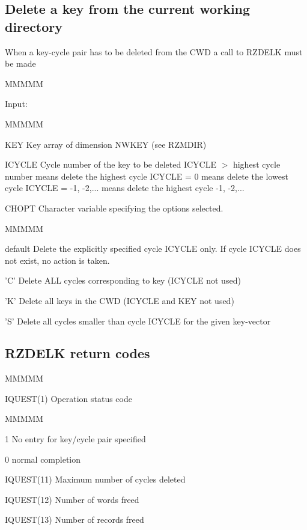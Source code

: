\subsection{Delete a key from the current working directory}
\par When a key-cycle pair has to be deleted from the
CWD a call to RZDELK must be made
\begin{DL}{MMMMM}
\item[Input:
]
\begin{DL}{MMMMM}
\item[KEY
]Key array of dimension NWKEY (see RZMDIR)
\item[ICYCLE
]Cycle number of the key to be deleted
\newline ICYCLE $>$ highest cycle number means delete the highest cycle
\newline ICYCLE = 0 means delete the lowest cycle
\newline ICYCLE = -1, -2,... means delete the highest cycle -1, -2,...
\item[CHOPT
]Character variable specifying the options selected.
\begin{DL}{MMMMM}
\item[default
]Delete the explicitly specified cycle ICYCLE only.
\newline If cycle ICYCLE does not exist, no action is taken.
\item['C'
]Delete ALL cycles corresponding to key (ICYCLE not used)
\item['K'
]Delete all keys in the CWD (ICYCLE and KEY not used)
\item['S'
]Delete all cycles smaller than cycle ICYCLE for the given key-vector
\end{DL}
\end{DL}
\end{DL}
\subsection{RZDELK return codes}
\begin{DL}{MMMMM}
\item[IQUEST(1)
]Operation status code
\begin{DL}{MMMMM}
\item[ 1
]No entry for key/cycle pair specified
\item[ 0
]normal completion
\end{DL}
\par
\item[IQUEST(11)
]Maximum number of cycles deleted
\item[IQUEST(12)
]Number of words freed
\item[IQUEST(13)
]Number of records freed
\end{DL}
